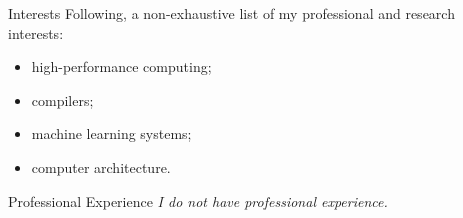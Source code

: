 \documentclass{resume}
\begin{document}
\begin{rSection}{Interests}
Following, a non-exhaustive list of my professional and research interests:

\setlength\multicolsep{5pt}
\begin{multicols}{2}
\begin{itemize}[noitemsep]
  \item high-performance computing;
  \item compilers;
  \item machine learning systems;
  \item computer architecture.
\end{itemize}
\end{multicols}

\end{rSection}


\begin{rSection}{Professional Experience}
{\it I do not have professional experience.}
\end{rSection}

\end{document}
